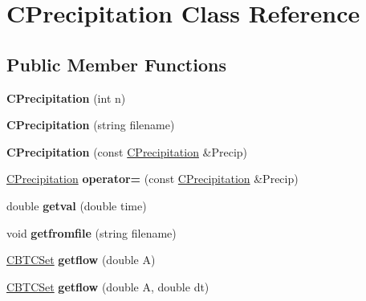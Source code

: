 \hypertarget{class_c_precipitation}{}\section{C\+Precipitation Class Reference}
\label{class_c_precipitation}
\subsection*{Public Member Functions}
\begin{DoxyCompactItemize}
\item 
\mbox{\label{class_c_precipitation_ae52d8e8a9121f8afe4190cb02bc8d385}} 
{\bfseries C\+Precipitation} (int n)
\item 
\mbox{\label{class_c_precipitation_a0319ded25e19677f5a3f8709fab67004}} 
{\bfseries C\+Precipitation} (string filename)
\item 
\mbox{\label{class_c_precipitation_ac1ddadb47b8c18a99f30cdf6403dbee5}} 
{\bfseries C\+Precipitation} (const \hyperlink{class_c_precipitation}{C\+Precipitation} \&Precip)
\item 
\mbox{\label{class_c_precipitation_aebb074b8913545472704115ce7effbcf}} 
\hyperlink{class_c_precipitation}{C\+Precipitation} {\bfseries operator=} (const \hyperlink{class_c_precipitation}{C\+Precipitation} \&Precip)
\item 
\mbox{\label{class_c_precipitation_a3c4074b463fcc3baef72d6de1e0a3839}} 
double {\bfseries getval} (double time)
\item 
\mbox{\label{class_c_precipitation_a1c73d8d971c06bc773902cb68b8a8153}} 
void {\bfseries getfromfile} (string filename)
\item 
\mbox{\label{class_c_precipitation_a561089c52dcca66b33112409222c933d}} 
\hyperlink{class_c_b_t_c_set}{C\+B\+T\+C\+Set} {\bfseries getflow} (double A)
\item 
\mbox{\label{class_c_precipitation_a2f4057c257e14516436612c6dc3b05e2}} 
\hyperlink{class_c_b_t_c_set}{C\+B\+T\+C\+Set} {\bfseries getflow} (double A, double dt)
\end{DoxyCompactItemize}
